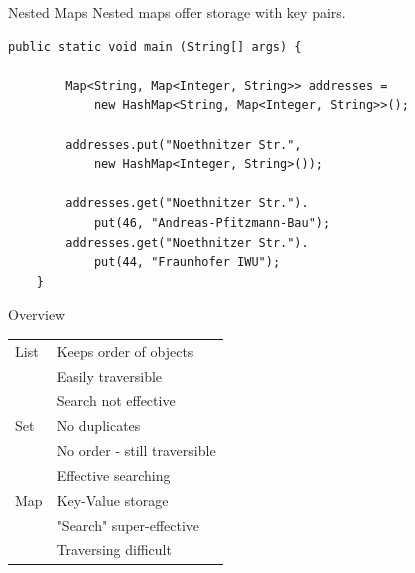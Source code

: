 \begin{frame}[fragile]{Nested Maps}
	Nested maps offer storage with key pairs.
	\begin{lstlisting}[basicstyle=\ttfamily\scriptsize]
	public static void main (String[] args) {		
	
	    Map<String, Map<Integer, String>> addresses = 
		    new HashMap<String, Map<Integer, String>>();
		
	    addresses.put("Noethnitzer Str.", 
	        new HashMap<Integer, String>());
		
	    addresses.get("Noethnitzer Str.").
	        put(46, "Andreas-Pfitzmann-Bau");
	    addresses.get("Noethnitzer Str.").
	        put(44, "Fraunhofer IWU");
	}
	\end{lstlisting}
\end{frame}

\begin{frame}{Overview}
	\begin{center}
		\begin{tabular}{ l | l }
			List & Keeps order of objects \\
				 & Easily traversible \\
				 & Search not effective \\
			\hline
			Set  & No duplicates \\
				 & No order - still traversible \\
				 & Effective searching \\
			\hline
			Map  & Key-Value storage \\
				 & "Search" super-effective \\
				 & Traversing difficult
			
		\end{tabular}
	\end{center}
\end{frame}

